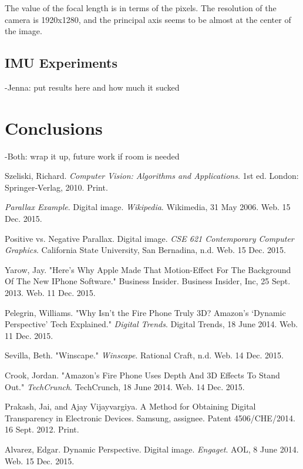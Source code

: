 \documentclass[12pt,twocolumn,letterpaper]{article}
\begin{document}
The value of the focal length is in terms of the pixels. The resolution of the camera is 1920x1280, and the principal axis seems to be almost at the center of the image.
\subsection{IMU Experiments}
    -Jenna: put results here and how much it sucked
\section{Conclusions}
    -Both: wrap it up, future work if room is needed
    
{\small{
\begin{thebibliography}{15}

Szeliski, Richard. \textit{Computer Vision: Algorithms and Applications}. 1st ed. London: Springer-Verlag, 2010. Print.

\textit{Parallax Example}. Digital image. \textit{Wikipedia}. Wikimedia, 31 May 2006. Web. 15 Dec. 2015.

Positive vs. Negative Parallax. Digital image. \textit{CSE 621 Contemporary Computer Graphics}. California State University, San Bernadina, n.d. Web. 15 Dec. 2015.

Yarow, Jay. "Here's Why Apple Made That Motion-Effect For The Background Of The New IPhone Software." Business Insider. Business Insider, Inc, 25 Sept. 2013. Web. 11 Dec. 2015.

Pelegrin, Williams. "Why Isn’t the Fire Phone Truly 3D? Amazon’s ‘Dynamic Perspective’ Tech Explained." \textit{Digital Trends}. Digital Trends, 18 June 2014. Web. 11 Dec. 2015.

Sevilla, Beth. "Winscape." \textit{Winscape}. Rational Craft, n.d. Web. 14 Dec. 2015.

Crook, Jordan. "Amazon’s Fire Phone Uses Depth And 3D Effects To Stand Out." \textit{TechCrunch}. TechCrunch, 18 June 2014. Web. 14 Dec. 2015.

Prakash, Jai, and Ajay Vijayvargiya. A Method for Obtaining Digital Transparency in Electronic Devices. Samsung, assignee. Patent 4506/CHE/2014. 16 Sept. 2012. Print.

Alvarez, Edgar. Dynamic Perspective. Digital image. \textit{Engaget}. AOL, 8 June 2014. Web. 15 Dec. 2015.


\end{thebibliography}}}
\end{document}
